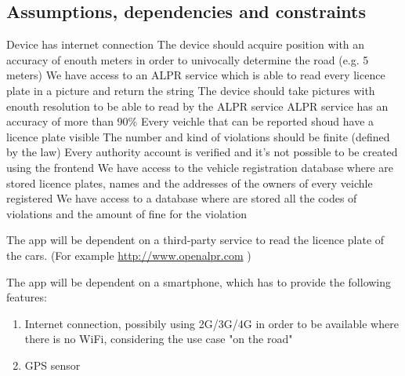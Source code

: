 \subsection{Assumptions, dependencies and constraints}
\begin{enumerate}
\dom{}  Device has internet connection
 The device should acquire position with an accuracy of enouth meters in order to univocally determine the road (e.g. 5 meters)
\dom{} We have access to an ALPR service which is able to read every licence plate in a picture and return the string
 The device should take pictures with enouth resolution to be able to read by the ALPR service
 ALPR service has an accuracy of more than 90\%
 Every veichle that can be reported shoud have a licence plate visible
 The number and kind of violations should be finite (defined by the law)
 Every authority account is verified and it's not possible to be created using the frontend
 We have access to the vehicle registration database where are stored licence plates, names and the addresses of the owners of every veichle registered
 We have access to a database where are stored all the codes of violations and the amount of fine for the violation

\end{enumerate}

The app will be dependent on a third-party service to read the licence plate of the cars. (For example \url{http://www.openalpr.com} )


The app will be dependent on a smartphone, which has to provide the following features:
\begin{enumerate}
  \item Internet connection, possibily using 2G/3G/4G in order to be available where there is no WiFi, considering the use case "on the road"
  \item GPS sensor
\end{enumerate}
